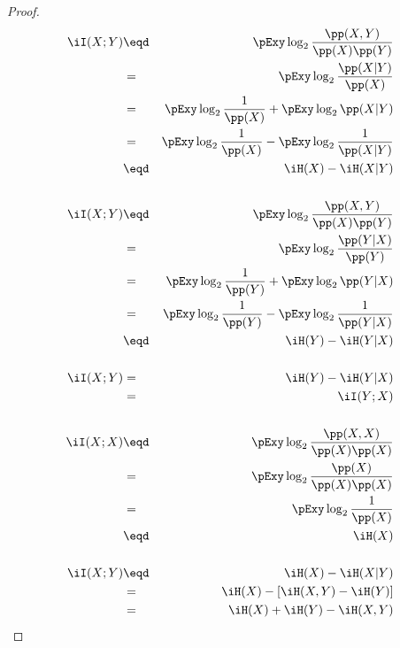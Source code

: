 \begin{theorem}
\end{theorem}
\begin{proof}
\begin{eqnarray*}
  \iI(X;Y)
    &\eqd& \pExy \log_2 \frac{ \pp(X,Y) }{\pp(X)\pp(Y)}
  \\&=&    \pExy \log_2 \frac{ \pp(X|Y) }{\pp(X)}
  \\&=&    \pExy \log_2 \frac{ 1 }{\pp(X)} + \pExy \log_2 \pp(X|Y) 
  \\&=&    \pExy \log_2 \frac{ 1 }{\pp(X)} - \pExy \log_2 \frac{1}{\pp(X|Y)}
  \\&\eqd& \iH(X) - \iH(X|Y)
\\
\\
  \iI(X;Y)
    &\eqd& \pExy \log_2 \frac{ \pp(X,Y) }{\pp(X)\pp(Y)}
  \\&=&    \pExy \log_2 \frac{ \pp(Y|X) }{\pp(Y)}
  \\&=&    \pExy \log_2 \frac{ 1 }{\pp(Y)} + \pExy \log_2 \pp(Y|X) 
  \\&=&    \pExy \log_2 \frac{ 1 }{\pp(Y)} - \pExy \log_2 \frac{1}{\pp(Y|X)}
  \\&\eqd& \iH(Y) - \iH(Y|X)
\\
\\
  \iI(X;Y)
    &=&    \iH(Y) - \iH(Y|X)
  \\&=&    \iI(Y;X)
\\
\\
  \iI(X;X)
    &\eqd& \pExy \log_2 \frac{ \pp(X,X) }{\pp(X)\pp(X)}
  \\&=&    \pExy \log_2 \frac{ \pp(X)   }{\pp(X)\pp(X)}
  \\&=&    \pExy \log_2 \frac{ 1        }{\pp(X)      }
  \\&\eqd& \iH(X)
\\
\\
  \iI(X;Y)
    &\eqd& \iH(X) - \iH(X|Y)
  \\&=&    \iH(X) - [ \iH(X,Y) - \iH(Y) ]
  \\&=&    \iH(X) + \iH(Y) - \iH(X,Y) 
\end{eqnarray*}
\end{proof}

